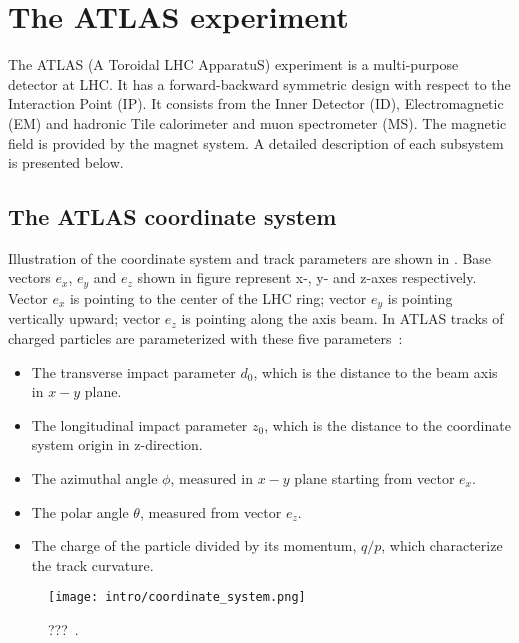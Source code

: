 \section{The ATLAS experiment}

% 

The ATLAS (A Toroidal LHC ApparatuS) experiment is a multi-purpose detector at LHC. It has a forward-backward symmetric design with respect to the Interaction Point (IP).
It consists from the Inner Detector (ID), Electromagnetic (EM) and hadronic Tile calorimeter and muon spectrometer (MS). The magnetic field is provided by the magnet system. A detailed description of each subsystem is presented below.

\subsection{The ATLAS coordinate system}

Illustration of the coordinate system and track parameters are shown in .
Base vectors $e_x$, $e_y$ and $e_z$ shown in figure represent x-, y- and z-axes respectively. Vector $e_x$ is pointing to the center of the LHC ring;
vector $e_y$ is pointing vertically upward; vector $e_z$ is pointing along the axis beam. 
In ATLAS tracks of charged particles are parameterized with these five parameters~\cite{track_parameterization}:
\begin{itemize}
 \item The transverse impact parameter $d_0$, which is the distance to the beam axis in $x-y$ plane. 
 \item The longitudinal impact parameter $z_0$, which is the distance to the coordinate system origin in z-direction.
 \item The azimuthal angle $\phi$, measured in $x-y$ plane starting from vector $e_x$. 
 \item The polar angle $\theta$, measured from vector $e_z$.
 \item The charge of the particle divided by its momentum, $q/p$, which characterize the track curvature.
\end{itemize}

\begin{figure}[]
  \centering
\texttt{[image: intro/coordinate\_system.png]}
\caption{???~\cite{Cornelissen:2007aca}.}
\label{fig:coordinate_system}
\end{figure}


